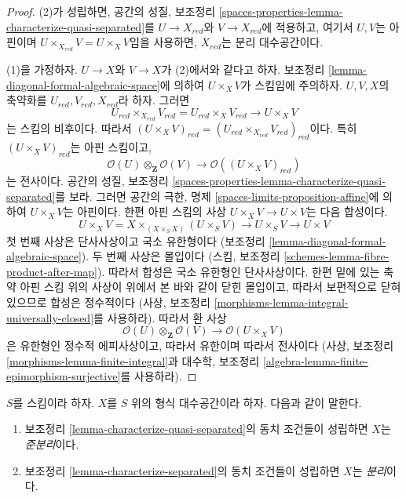 \begin{proof}
(2)가 성립하면, 공간의 성질, 보조정리
\ref{spaces-properties-lemma-characterize-quasi-separated}를
$U \to X_{red}$와 $V \to X_{red}$에 적용하고, 여기서 $U, V$는
아핀이며 $U \times_{X_{red}} V = U \times_X V$임을 사용하면,
$X_{red}$는 분리 대수공간이다.

\medskip\noindent
(1)을 가정하자. $U \to X$와 $V \to X$가 (2)에서와 같다고 하자.
보조정리 \ref{lemma-diagonal-formal-algebraic-space}에 의하여
$U \times_X V$가 스킴임에 주의하자.
$U, V, X$의 축약화를 $U_{red}, V_{red}, X_{red}$라 하자.
그러면
$$
U_{red} \times_{X_{red}} V_{red} = U_{red} \times_X V_{red} \to U \times_X V
$$
는 스킴의 비후이다. 따라서
$(U \times_X V)_{red} = (U_{red} \times_{X_{red}} V_{red})_{red}$이다.
특히 $(U \times_X V)_{red}$는 아핀 스킴이고,
$$
\mathcal{O}(U) \otimes_\mathbf{Z} \mathcal{O}(V)
\longrightarrow
\mathcal{O}((U \times_X V)_{red})
$$
는 전사이다. 공간의 성질, 보조정리
\ref{spaces-properties-lemma-characterize-quasi-separated}를 보라.
그러면 공간의 극한, 명제 \ref{spaces-limits-proposition-affine}에
의하여 $U \times_X V$는 아핀이다. 한편 아핀 스킴의 사상
$U \times_X V \to U \times V$는 다음 합성이다.
$$
U \times_X V = X \times_{(X \times_S X)} (U \times_S V)
\to U \times_S V \to U \times V
$$
첫 번째 사상은 단사사상이고 국소 유한형이다
(보조정리 \ref{lemma-diagonal-formal-algebraic-space}).
두 번째 사상은 몰입이다
(스킴, 보조정리 \ref{schemes-lemma-fibre-product-after-map}).
따라서 합성은 국소 유한형인 단사사상이다.
한편 밑에 있는 축약 아핀 스킴 위의 사상이 위에서 본 바와 같이
닫힌 몰입이고, 따라서 보편적으로 닫혀 있으므로 합성은 정수적이다
(사상, 보조정리
\ref{morphisms-lemma-integral-universally-closed}를 사용하라).
따라서 환 사상
$$
\mathcal{O}(U) \otimes_\mathbf{Z} \mathcal{O}(V)
\longrightarrow
\mathcal{O}(U \times_X V)
$$
은 유한형인 정수적 에피사상이고, 따라서 유한이며 따라서 전사이다
(사상, 보조정리 \ref{morphisms-lemma-finite-integral}과
대수학, 보조정리
\ref{algebra-lemma-finite-epimorphism-surjective}를 사용하라).
\end{proof}

\begin{definition}
\label{definition-separated}
$S$를 스킴이라 하자. $X$를 $S$ 위의 형식 대수공간이라 하자.
다음과 같이 말한다.
\begin{enumerate}
\item 보조정리 \ref{lemma-characterize-quasi-separated}의 동치 조건들이
성립하면 $X$는 {\it 준분리}이다.
\item 보조정리 \ref{lemma-characterize-separated}의 동치 조건들이
성립하면 $X$는 {\it 분리}이다.
\end{enumerate}
\end{definition}

